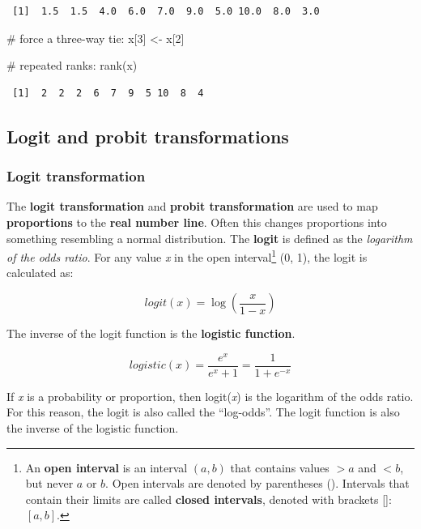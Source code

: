 \documentclass[
  13,
  letterpaper,
]{report}
\newenvironment{Shaded}{\begin{snugshade}}{\end{snugshade}}
\newcommand{\CommentTok}[1]{\textcolor[rgb]{0.37,0.37,0.37}{#1}}
\newcommand{\DecValTok}[1]{\textcolor[rgb]{0.68,0.00,0.00}{#1}}
\newcommand{\FunctionTok}[1]{\textcolor[rgb]{0.28,0.35,0.67}{#1}}
\newcommand{\NormalTok}[1]{\textcolor[rgb]{0.00,0.23,0.31}{#1}}
\newcommand{\OtherTok}[1]{\textcolor[rgb]{0.00,0.23,0.31}{#1}}
\begin{document}
\begin{verbatim}
 [1]  1.5  1.5  4.0  6.0  7.0  9.0  5.0 10.0  8.0  3.0
\end{verbatim}

\begin{Shaded}
\begin{Highlighting}[]
\CommentTok{\# force a three{-}way tie:}
\NormalTok{x[}\DecValTok{3}\NormalTok{] }\OtherTok{\textless{}{-}}\NormalTok{ x[}\DecValTok{2}\NormalTok{]}

\CommentTok{\# repeated ranks:}
\FunctionTok{rank}\NormalTok{(x)}
\end{Highlighting}
\end{Shaded}

\begin{verbatim}
 [1]  2  2  2  6  7  9  5 10  8  4
\end{verbatim}

\subsection{Logit and probit transformations}\label{sec-trans-common-lp}

\subsubsection{Logit transformation}\label{sec-trans-common-lp-logit}

The \textbf{logit transformation} and \textbf{probit transformation} are
used to map \textbf{proportions} to the \textbf{real number line}. Often
this changes proportions into something resembling a normal
distribution. The \textbf{logit} is defined as the \emph{logarithm of
the odds ratio}. For any value \emph{x} in the open interval\footnote{An
  \textbf{open interval} is an interval \(\left(a,b\right)\) that
  contains values \(>a\) and \(<b\), but never \(a\) or \(b\). Open
  intervals are denoted by parentheses (). Intervals that contain their
  limits are called \textbf{closed intervals}, denoted with brackets
  {[}{]}: \(\left[a,b\right]\).} (0, 1), the logit is calculated as:

\[logit\left(x\right)=\log{\left(\frac{x}{1-x}\right)}\]

The inverse of the logit function is the \textbf{logistic function}.

\[logistic\left(x\right)=\frac{e^x}{e^x+1}=\frac{1}{1+e^{-x}}\]

If \emph{x} is a probability or proportion, then logit(\emph{x}) is the
logarithm of the odds ratio. For this reason, the logit is also called
the ``log-odds''. The logit function is also the inverse of the logistic
function.
\end{document}

